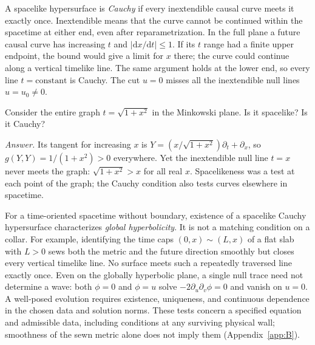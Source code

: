 A spacelike hypersurface is \emph{Cauchy} if every inextendible causal curve meets it exactly once. Inextendible means that the curve cannot be continued within the spacetime at either end, even after reparametrization. In the full plane a future causal curve has increasing $t$ and $|\mathrm{d}x/\mathrm{d}t|\leq1$. If its $t$ range had a finite upper endpoint, the bound would give a limit for $x$ there; the curve could continue along a vertical timelike line. The same argument holds at the lower end, so every line $t=\text{constant}$ is Cauchy. The cut $u=0$ misses all the inextendible null lines $u=u_0\ne0$.

\begin{exercise}
Consider the entire graph $t=\sqrt{1+x^2}$ in the Minkowski plane. Is it spacelike? Is it Cauchy?

\emph{Answer.} Its tangent for increasing $x$ is $Y=(x/\sqrt{1+x^2})\partial_t+\partial_x$, so $g(Y,Y)=1/(1+x^2)>0$ everywhere. Yet the inextendible null line $t=x$ never meets the graph: $\sqrt{1+x^2}>x$ for all real $x$. Spacelikeness was a test at each point of the graph; the Cauchy condition also tests curves elsewhere in spacetime.
\end{exercise}

For a time-oriented spacetime without boundary, existence of a spacelike Cauchy hypersurface characterizes \emph{global hyperbolicity}. It is not a matching condition on a collar. For example, identifying the time caps $(0,x)\sim (L,x)$ of a flat slab with $L>0$ sews both the metric and the future direction smoothly but closes every vertical timelike line. No surface meets such a repeatedly traversed line exactly once. Even on the globally hyperbolic plane, a single null trace need not determine a wave: both $\phi=0$ and $\phi=u$ solve $-2\partial_u\partial_v\phi=0$ and vanish on $u=0$. A well-posed evolution requires existence, uniqueness, and continuous dependence in the chosen data and solution norms. These tests concern a specified equation and admissible data, including conditions at any surviving physical wall; smoothness of the sewn metric alone does not imply them (Appendix~\ref{app:B}).
